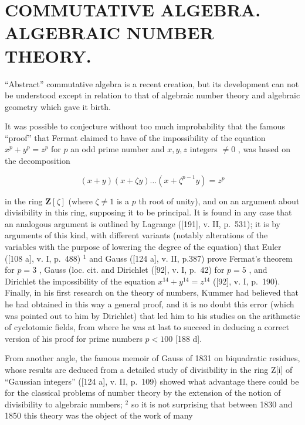 \chapter{COMMUTATIVE ALGEBRA. ALGEBRAIC NUMBER THEORY.}

``Abstract'' commutative algebra is a recent creation, but its development can not be understood except in relation to that of algebraic number theory and algebraic geometry which gave it birth.

It was possible to conjecture without too much improbability that the famous ``proof'' that Fermat claimed to have of the impossibility of the equation \(x^{p} + y^{p} = z^{p}\) for \(p\) an odd prime number and \(x, y, z\) integers \(\neq 0\) , was based on the decomposition

\[
(x + y) (x + \zeta y) \dots (x + \zeta^ {p - 1} y) = z ^ {p}
\]

in the ring \(\mathbf{Z}[\zeta]\) (where \(\zeta \neq 1\) is a \(p\) th root of unity), and on an argument about divisibility in this ring, supposing it to be principal. It is found in any case that an analogous argument is outlined by Lagrange ({[}191{]}, v. II, p.~531); it is by arguments of this kind, with different variants (notably alterations of the variables with the purpose of lowering the degree of the equation) that Euler ({[}108 a{]}, v. I, p.~488) \(^{1}\) and Gauss ({[}124 a{]}, v. II, p.387) prove Fermat's theorem for \(p = 3\) , Gauss (loc. cit. and Dirichlet ({[}92{]}, v. I, p.~42) for \(p = 5\) , and Dirichlet the impossibility of the equation \(x^{14} + y^{14} = z^{14}\) ({[}92{]}, v. I, p.~190). Finally, in his first research on the theory of numbers, Kummer had believed that he had obtained in this way a general proof, and it is no doubt this error (which was pointed out to him by Dirichlet) that led him to his studies on the arithmetic of cyclotomic fields, from where he was at last to succeed in deducing a correct version of his proof for prime numbers \(p < 100\) {[}188 d{]}.

From another angle, the famous memoir of Gauss of 1831 on biquadratic residues, whose results are deduced from a detailed study of divisibility in the ring Z{[}i{]} of ``Gaussian integers'' ({[}124 a{]}, v. II, p.~109) showed what advantage there could be for the classical problems of number theory by the extension of the notion of divisibility to algebraic numbers; \(^{2}\) so it is not surprising that between 1830 and 1850 this theory was the object of the work of many

